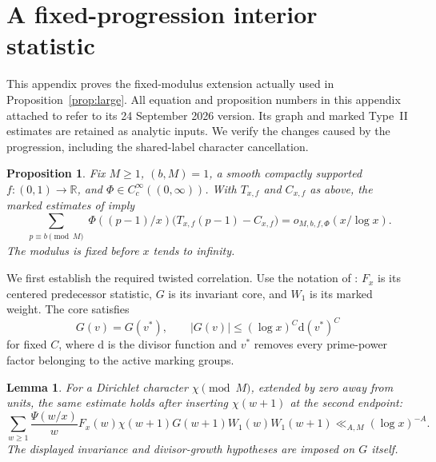 \documentclass[11pt]{article}
\newtheorem{proposition}[theorem]{Proposition}
\newtheorem{lemma}[theorem]{Lemma}
\theoremstyle{remark}
\newcommand{\1}{\mathbf 1}
\begin{document}
\appendix
\section{A fixed-progression interior statistic}\label{sec:ap}

This appendix proves the fixed-modulus extension actually used in
Proposition~\ref{prop:large}.  All equation and proposition numbers
in this appendix attached to \cite{PD} refer to its
24 September 2026 version.  Its graph and marked Type~II estimates
are retained as analytic inputs.  We verify the changes caused by
the progression, including the shared-label character cancellation.

\begin{proposition}\label{prop:interior}
Fix $M\ge1$, $(b,M)=1$, a smooth compactly supported
$f:(0,1)\to\mathbb R$, and
$\Phi\in C_c^\infty((0,\infty))$.  With $T_{x,f}$ and
$C_{x,f}$ as above, the marked estimates of \cite{OAI,PD} imply
\begin{equation}\label{eq:interior}
 \sum_{\substack{p\equiv b\pmod M}}
 \Phi((p-1)/x)
       \bigl(T_{x,f}(p-1)-C_{x,f}\bigr)
 =o_{M,b,f,\Phi}(x/\log x).
\end{equation}
The modulus is fixed before $x$ tends to infinity.
\end{proposition}

We first establish the required twisted correlation.  Use the
notation of \cite[Theorem~6.1]{PD}: $F_x$ is its centered
predecessor statistic, $G$ is its invariant core, and $W_1$ is
its marked weight.  The core satisfies
\[
 G(v)=G(v^*),\qquad
 |G(v)|\le(\log x)^C\mathrm d(v^*)^C
\]
for fixed $C$, where $\mathrm d$ is the divisor function and
$v^*$ removes every prime-power factor belonging to the active
marking groups.

\begin{lemma}\label{lem:character}
For a Dirichlet character $\chi\pmod M$, extended by zero away
from units, the same estimate holds after inserting
$\chi(w+1)$ at the second endpoint:
\begin{equation}\label{eq:twisted}
 \sum_{w\ge1}\frac{\Psi(w/x)}w
 F_x(w)\chi(w+1)G(w+1)W_1(w)W_1(w+1)
 \ll_{A,M}(\log x)^{-A}.
\end{equation}
The displayed invariance and divisor-growth hypotheses are
imposed on $G$ itself.
\end{lemma}
\end{document}
